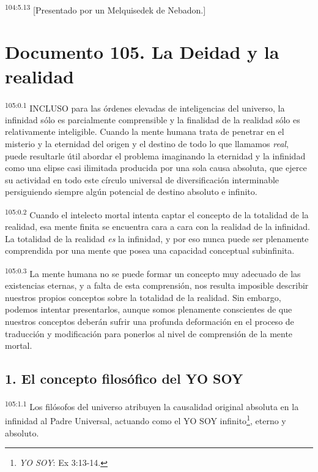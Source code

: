 \documentclass[twoside, 11pt]{book}
\begin{document}
\par
\textsuperscript{104:5.13} [Presentado por un Melquisedek de Nebadon.]


\chapter{Documento 105. La Deidad y la realidad}
\par
\textsuperscript{105:0.1} INCLUSO para las órdenes elevadas de inteligencias del universo, la infinidad sólo es parcialmente comprensible y la finalidad de la realidad sólo es relativamente inteligible. Cuando la mente humana trata de penetrar en el misterio y la eternidad del origen y el destino de todo lo que llamamos \textit{real}, puede resultarle útil abordar el problema imaginando la eternidad y la infinidad como una elipse casi ilimitada producida por una sola causa absoluta, que ejerce su actividad en todo este círculo universal de diversificación interminable persiguiendo siempre algún potencial de destino absoluto e infinito.

\par
\textsuperscript{105:0.2} Cuando el intelecto mortal intenta captar el concepto de la totalidad de la realidad, esa mente finita se encuentra cara a cara con la realidad de la infinidad. La totalidad de la realidad \textit{es} la infinidad, y por eso nunca puede ser plenamente comprendida por una mente que posea una capacidad conceptual subinfinita.

\par
\textsuperscript{105:0.3} La mente humana no se puede formar un concepto muy adecuado de las existencias eternas, y a falta de esta comprensión, nos resulta imposible describir nuestros propios conceptos sobre la totalidad de la realidad. Sin embargo, podemos intentar presentarlos, aunque somos plenamente conscientes de que nuestros conceptos deberán sufrir una profunda deformación en el proceso de traducción y modificación para ponerlos al nivel de comprensión de la mente mortal.

\section*{1. El concepto filosófico del YO SOY}
\par
\textsuperscript{105:1.1} Los filósofos del universo atribuyen la causalidad original absoluta en la infinidad al Padre Universal, actuando como el YO SOY infinito\footnote{\textit{YO SOY}: Ex 3:13-14.}, eterno y absoluto.
\end{document}
